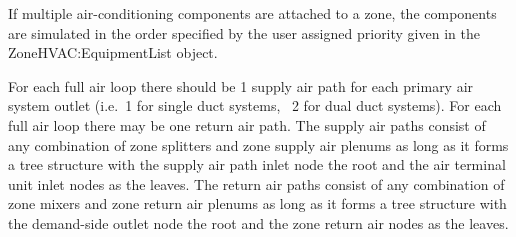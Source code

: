 If multiple air-conditioning components are attached to a zone, the components are simulated in the order specified by the user assigned priority given in the ZoneHVAC:EquipmentList object.

For each full air loop there should be 1 supply air path for each primary air system outlet (i.e.~1 for single duct systems,~ 2 for dual duct systems). For each full air loop there may be one return air path. The supply air paths consist of any combination of zone splitters and zone supply air plenums as long as it forms a tree structure with the supply air path inlet node the root and the air terminal unit inlet nodes as the leaves. The return air paths consist of any combination of zone mixers and zone return air plenums as long as it forms a tree structure with the demand-side outlet node the root and the zone return air nodes as the leaves.

